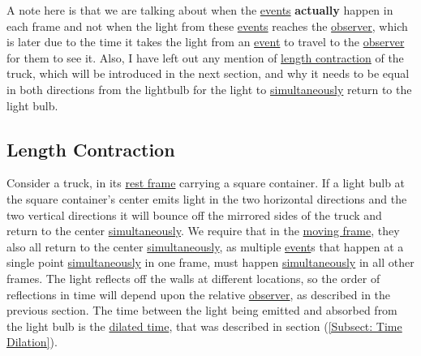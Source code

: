 A note here is that we are talking about when the \hyperlink{def-event}{events} \textbf{actually} happen in each frame and not when the light from these \hyperlink{def-event}{events} reaches the \hyperlink{def-observer}{observer}, which is later due to the time it takes the light from an \hyperlink{def-event}{event} to travel to the \hyperlink{def-observer}{observer} for them to see it.
Also, I have left out any mention of \hyperlink{def-length-contraction}{length contraction} of the truck, which will be introduced in the next section, and why it needs to be equal in both directions from the lightbulb for the light to \hyperlink{def-simultaneity}{simultaneously} return to the light bulb.


\subsection{Length Contraction} \label{subsect: Length Contraction}

Consider a truck, in its \hyperlink{def-proper-frame}{rest frame} carrying a square container.
If a light bulb at the square container's center emits light in the two horizontal directions and the two vertical directions it will bounce off the mirrored sides of the truck and return to the center \hyperlink{def-simultaneity}{simultaneously}.
We require that in the \hyperlink{def-Moving-Frame}{moving frame}, they also all return to the center \hyperlink{def-simultaneity}{simultaneously}, as multiple \hyperlink{def-event}{event}s that happen at a single point \hyperlink{def-simultaneity}{simultaneously} in one frame, must happen \hyperlink{def-simultaneity}{simultaneously} in all other frames.
The light reflects off the walls at different locations, so the order of reflections in time will depend upon the relative \hyperlink{def-observer}{observer}, as described in the previous section.
The time between the light being emitted and absorbed from the light bulb is the \hyperlink{def-time-dilation}{dilated time}, that was described in section (\ref{Subsect: Time Dilation}).

